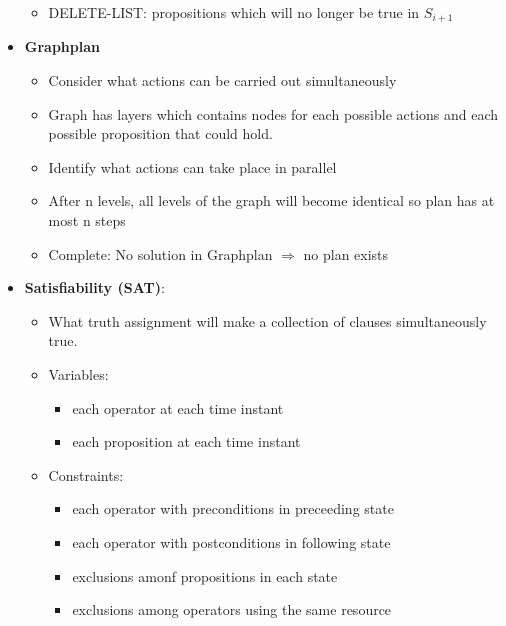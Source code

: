 \documentclass[10pt,a4paper,landscape]{article}
\begin{document}
\begin{multicols*}{2}
\begin{itemize}
\begin{itemize}
		\item DELETE-LIST: propositions which will no longer be true in $S_{i + 1}$
	\end{itemize}
	\item \textbf{Graphplan}
	\begin{itemize}
		\item Consider what actions can be carried out simultaneously
		\item Graph has layers which contains nodes for each possible actions and each possible proposition that could hold. 
		\item Identify what actions can take place in parallel
		\item After n levels, all levels of the graph will become identical so plan has at most n steps
		\item Complete: No solution in Graphplan $\Rightarrow$ no plan exists
		
	\end{itemize}
	\item \textbf{Satisfiability (SAT)}: %
	\begin{itemize}
		\item What truth assignment will make a collection of clauses simultaneously true.
		\item Variables:
		\begin{itemize}
			\item each operator at each time instant
			\item each proposition at each time instant
		\end{itemize}
		\item Constraints:
		\begin{itemize}
			\item each operator with preconditions in preceeding state
			\item each operator with postconditions in following state
			\item exclusions amonf propositions in each state
			\item exclusions among operators using the same resource
		\end{itemize}
	\end{itemize}

\end{itemize}


\end{multicols*}
\end{document}
